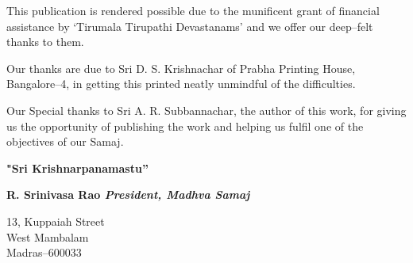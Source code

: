 This publication is rendered possible due to the munificent grant of financial assistance by `Tirumala Tirupathi Devastanams' and we offer our deep–felt thanks to them.

Our thanks are due to Sri D. S. Krishnachar of Prabha Printing House, Bangalore–4, in getting this printed neatly unmindful of the difficulties.

\eject

Our Special thanks to Sri A. R. Subbannachar, the author of this work, for giving us the opportunity of publishing the work and helping us fulfil one of the objectives of our Samaj.

\begin{center}
\textbf{"Sri Krishnarpanamastu”}
\end{center}

\begin{flushright}
\textbf{R. Srinivasa Rao \textit{President, Madhva Samaj}}
\end{flushright}

\begin{flushleft}
13, Kuppaiah Street \\ West Mambalam \\ Madras–600033
\end{flushleft}

